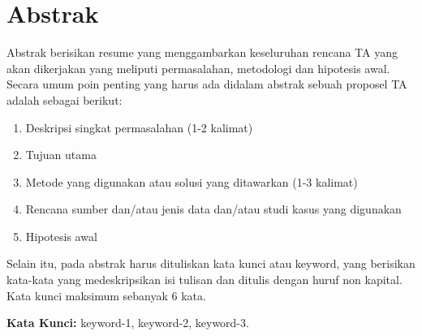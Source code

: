 \chapter*{Abstrak}

Abstrak berisikan resume yang menggambarkan keseluruhan rencana TA yang akan dikerjakan yang meliputi permasalahan, metodologi dan hipotesis awal. Secara umum poin penting yang harus ada didalam abstrak sebuah proposel TA adalah sebagai berikut:
\begin{enumerate}
    \item Deskripsi singkat permasalahan (1-2 kalimat)
    \item Tujuan utama
    \item Metode yang digunakan atau solusi yang ditawarkan (1-3 kalimat)
    \item Rencana sumber dan/atau jenis data dan/atau studi kasus yang digunakan
    \item Hipotesis awal
\end{enumerate}

Selain itu, pada abstrak harus dituliskan kata kunci atau keyword, yang berisikan kata-kata yang medeskripsikan isi tulisan dan ditulis dengan huruf non kapital. Kata kunci maksimum sebanyak 6 kata.
  
\vspace{0.5 cm}
\begin{flushleft}
{\textbf{Kata Kunci:} keyword-1, keyword-2, keyword-3.}
\end{flushleft}